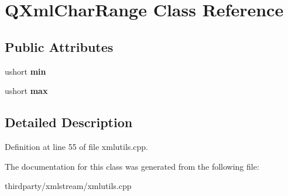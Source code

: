 \hypertarget{class_q_xml_char_range}{}\section{Q\+Xml\+Char\+Range Class Reference}
\label{class_q_xml_char_range}
\subsection*{Public Attributes}
\begin{DoxyCompactItemize}
\item 
\mbox{\label{class_q_xml_char_range_a4ba072924db1f89f871e5becc7a4bd12}} 
ushort {\bfseries min}
\item 
\mbox{\label{class_q_xml_char_range_a4d7d71d7501cc0d03ab9b9003ce7bfbe}} 
ushort {\bfseries max}
\end{DoxyCompactItemize}


\subsection{Detailed Description}


Definition at line 55 of file xmlutils.\+cpp.



The documentation for this class was generated from the following file\+:\begin{DoxyCompactItemize}
\item 
thirdparty/xmlstream/xmlutils.\+cpp\end{DoxyCompactItemize}
